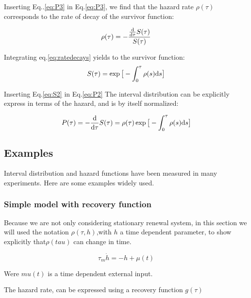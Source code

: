 \documentclass[a4paper,11pt,twoside]{article}
\def \dd  {{\rm d}}
\numberwithin{equation}{section}
\begin{document}
Inserting Eq..\eqref{eq:P3} in Eq.\eqref{eq:P3}, we find that the hazard rate $\rho(\tau)$ corresponds to the rate of decay of the survivor function:

\begin{equation}
\label{eq:ratedecays}
\rho(\tau)=-\frac{\frac{\dd}{\dd \tau}S(\tau)}{S(\tau)}
\end{equation}

Integrating eq.\ref{eq:ratedecays} yields to the survivor function:
\begin{equation}
\label{eq:S2}
S(\tau)=\exp\big[-\int_0^\tau\rho(s)\dd s\big]
\end{equation}

 Inserting Eq.\eqref{eq:S2} in Eq.\eqref{eq:P2} The interval distribution can be explicitly express in terms of the hazard, and is by itself normalized:

\begin{equation}
\label{eq:P4}
P(\tau)=-\frac{\dd}{\dd \tau}S(\tau)=\rho(\tau)\exp\big[-\int_0^\tau\rho(s)\dd s\big]
\end{equation}



\subsection{Examples }
\label{sec:ex}

Interval distribution and hazard functions have been measured in many experiments. Here are some examples widely used.



\subsubsection{Simple model with recovery function}


Because we are not only considering stationary renewal system, in this section we will used the notation $\rho(\tau,h)$,with $h$ a time dependent parameter, to show explicitly that$\rho(tau)$ can change in time.


\begin{equation}
\label{eq:hi}
\tau_m\dot h=-h+\mu(t)
\end{equation}


Were $mu(t)$ is a time dependent external input.

The hazard rate, can be expressed using a recovery function $g(\tau)$
\end{document}
